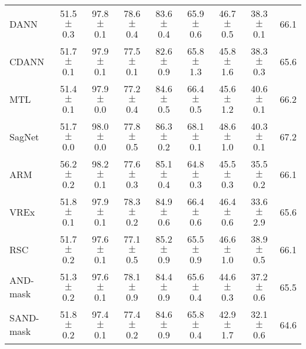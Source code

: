 \documentclass{article}
\begin{document}
\begin{center}
{\begin{tabular}{lcccccccc}
DANN                      & 51.5 $\pm$ 0.3            & 97.8 $\pm$ 0.1            & 78.6 $\pm$ 0.4            & 83.6 $\pm$ 0.4            & 65.9 $\pm$ 0.6            & 46.7 $\pm$ 0.5            & 38.3 $\pm$ 0.1            & 66.1                      \\
CDANN                     & 51.7 $\pm$ 0.1            & 97.9 $\pm$ 0.1            & 77.5 $\pm$ 0.1            & 82.6 $\pm$ 0.9            & 65.8 $\pm$ 1.3            & 45.8 $\pm$ 1.6            & 38.3 $\pm$ 0.3            & 65.6                      \\
MTL                       & 51.4 $\pm$ 0.1            & 97.9 $\pm$ 0.0            & 77.2 $\pm$ 0.4            & 84.6 $\pm$ 0.5            & 66.4 $\pm$ 0.5            & 45.6 $\pm$ 1.2            & 40.6 $\pm$ 0.1            & 66.2                      \\
SagNet                    & 51.7 $\pm$ 0.0            & 98.0 $\pm$ 0.0            & 77.8 $\pm$ 0.5            & 86.3 $\pm$ 0.2            & 68.1 $\pm$ 0.1            & 48.6 $\pm$ 1.0            & 40.3 $\pm$ 0.1            & 67.2                      \\
ARM                       & 56.2 $\pm$ 0.2            & 98.2 $\pm$ 0.1            & 77.6 $\pm$ 0.3            & 85.1 $\pm$ 0.4            & 64.8 $\pm$ 0.3            & 45.5 $\pm$ 0.3            & 35.5 $\pm$ 0.2            & 66.1                      \\
VREx                      & 51.8 $\pm$ 0.1            & 97.9 $\pm$ 0.1            & 78.3 $\pm$ 0.2            & 84.9 $\pm$ 0.6            & 66.4 $\pm$ 0.6            & 46.4 $\pm$ 0.6            & 33.6 $\pm$ 2.9            & 65.6                      \\
RSC                       & 51.7 $\pm$ 0.2            & 97.6 $\pm$ 0.1            & 77.1 $\pm$ 0.5            & 85.2 $\pm$ 0.9            & 65.5 $\pm$ 0.9            & 46.6 $\pm$ 1.0            & 38.9 $\pm$ 0.5            & 66.1                      \\
AND-mask                  & 51.3 $\pm$ 0.2            & 97.6 $\pm$ 0.1            & 78.1 $\pm$ 0.9            & 84.4 $\pm$ 0.9            & 65.6 $\pm$ 0.4            & 44.6 $\pm$ 0.3            & 37.2 $\pm$ 0.6            & 65.5                      \\
SAND-mask                 & 51.8 $\pm$ 0.2            & 97.4 $\pm$ 0.1            & 77.4 $\pm$ 0.2            & 84.6 $\pm$ 0.9            & 65.8 $\pm$ 0.4            & 42.9 $\pm$ 1.7            & 32.1 $\pm$ 0.6            & 64.6                      \\

\end{tabular}}
\end{center}
\end{document}

